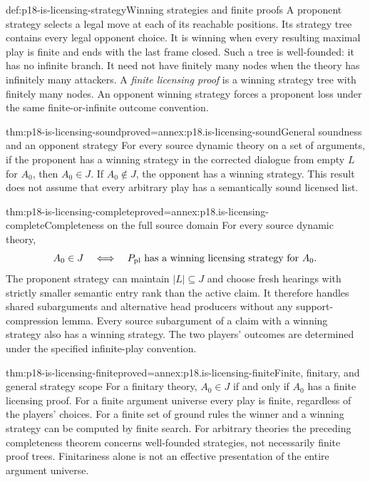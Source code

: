\begin{hbdefinition}{def:p18-is-licensing-strategy}{Winning strategies and finite proofs}
A proponent strategy selects a legal move at each of its reachable
positions. Its strategy tree contains every legal opponent choice.
It is winning when every resulting maximal play is finite and
ends with the last frame closed. Such a tree is well-founded:
it has no infinite branch. It need not have finitely many nodes
when the theory has infinitely many attackers.
A \emph{finite licensing proof} is a winning strategy tree with
finitely many nodes.
An opponent winning strategy forces a proponent loss under the
same finite-or-infinite outcome convention.
\end{hbdefinition}

\begin{hbtheorem}{thm:p18-is-licensing-sound}{proved=annex:p18.is-licensing-sound}{General soundness and an opponent strategy}
For every source dynamic theory on a set of arguments, if the
proponent has a winning strategy in the corrected dialogue from
empty \(L\) for \(A_0\), then \(A_0\in J\).
If \(A_0\notin J\), the opponent has a winning strategy.
This result does not assume that every arbitrary play has a
semantically sound licensed list.
\end{hbtheorem}

\begin{hbtheorem}{thm:p18-is-licensing-complete}{proved=annex:p18.is-licensing-complete}{Completeness on the full source domain}
For every source dynamic theory,
\[
 A_0\in J
 \quad\Longleftrightarrow\quad
 P_{\rm pl}\text{ has a winning licensing strategy for }A_0.
\]
The proponent strategy can maintain \(|L|\subseteq J\) and choose
fresh hearings with strictly smaller semantic entry rank than
the active claim. It therefore handles shared subarguments and
alternative head producers without any support-compression lemma.
Every source subargument of a claim with a winning strategy also
has a winning strategy.
The two players' outcomes are determined under the specified
infinite-play convention.
\end{hbtheorem}

\begin{hbtheorem}{thm:p18-is-licensing-finite}{proved=annex:p18.is-licensing-finite}{Finite, finitary, and general strategy scope}
For a finitary theory, \(A_0\in J\) if and only if \(A_0\) has
a finite licensing proof.
For a finite argument universe every play is finite, regardless
of the players' choices. For a finite set of ground rules the
winner and a winning strategy can be computed by finite search.
For arbitrary theories the preceding completeness theorem concerns
well-founded strategies, not necessarily finite proof trees.
Finitariness alone is not an effective presentation of the entire
argument universe.
\end{hbtheorem}

